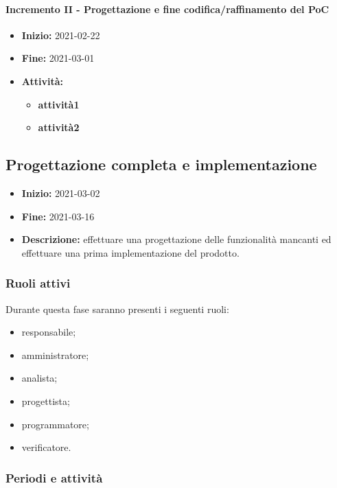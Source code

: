\paragraph[Incremento II]{Incremento II - \textnormal{Progettazione e fine codifica/raffinamento del PoC}}
\begin{itemize}
    \item [] \textbf{Inizio:} 2021-02-22
    \item [] \textbf{Fine:} 2021-03-01
    \item [] \textbf{Attività:}
          \begin{itemize}
            \item \textbf{attività1}
            \item \textbf{attività2}
          \end{itemize}
\end{itemize}


\subsection{Progettazione completa e implementazione} \label{_pianificazioneProgettazioneCompletaImplementazione}
\begin{itemize}
    \item []\textbf{Inizio:} 2021-03-02
    \item []\textbf{Fine:} 2021-03-16
    \item []\textbf{Descrizione:} effettuare una progettazione delle funzionalità mancanti ed effettuare una prima implementazione del prodotto.
\end{itemize}

\subsubsection{Ruoli attivi}
Durante questa fase saranno presenti i seguenti ruoli:
\begin{itemize}
    \item responsabile;
    \item amministratore;
    \item analista;
    \item progettista;
    \item programmatore;
    \item verificatore.
\end{itemize}

\subsubsection{Periodi e attività}

